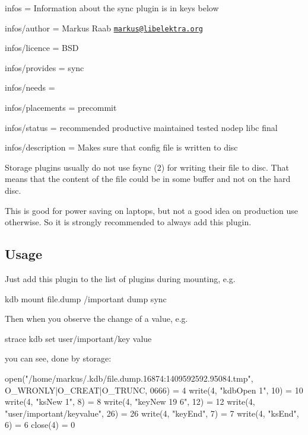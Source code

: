 
\begin{DoxyItemize}
\item infos = Information about the sync plugin is in keys below
\item infos/author = Markus Raab \href{mailto:markus@libelektra.org}{\tt markus@libelektra.\+org}
\item infos/licence = B\+S\+D
\item infos/provides = sync
\item infos/needs =
\item infos/placements = precommit
\item infos/status = recommended productive maintained tested nodep libc final
\item infos/description = Makes sure that config file is written to disc
\end{DoxyItemize}

Storage plugins usually do not use fsync (2) for writing their file to disc. That means that the content of the file could be in some buffer and not on the hard disc.

This is good for power saving on laptops, but not a good idea on production use otherwise. So it is strongly recommended to always add this plugin.

\subsection*{Usage}

Just add this plugin to the list of plugins during mounting, e.\+g. \begin{DoxyVerb}kdb mount file.dump /important dump sync
\end{DoxyVerb}


Then when you observe the change of a value, e.\+g. \begin{DoxyVerb}strace kdb set user/important/key value
\end{DoxyVerb}


you can see, done by storage\+: \begin{DoxyVerb}open("/home/markus/.kdb/file.dump.16874:1409592592.95084.tmp", 
        O_WRONLY|O_CREAT|O_TRUNC, 0666) = 4
write(4, "kdbOpen 1\n", 10)             = 10
write(4, "ksNew 1\n", 8)                = 8
write(4, "keyNew 19 6\n", 12)           = 12
write(4, "user/important/key\0value\0\n", 26) = 26
write(4, "keyEnd\n", 7)                 = 7
write(4, "ksEnd\n", 6)                  = 6
close(4)                                = 0
\end{DoxyVerb}


